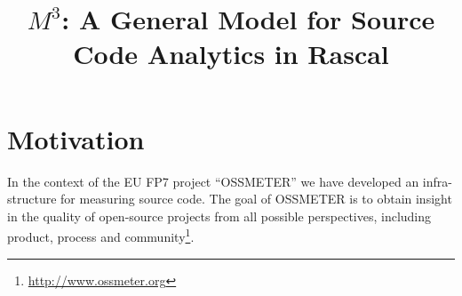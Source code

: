 \documentclass[conference]{IEEEtran}
\begin{document}
\title{{\huge $M^3$: A General Model for Source Code Analytics in Rascal}}

\author{
\and
{}
}

\maketitle

\section{Motivation}

In the context of the EU FP7 project ``OSSMETER'' we have developed an infra-
structure for measuring source code. The goal of OSSMETER is to obtain insight
in the quality of open-source projects from all possible perspectives, including product, process and community\footnote{\url{http://www.ossmeter.org}}. 
\end{document}
